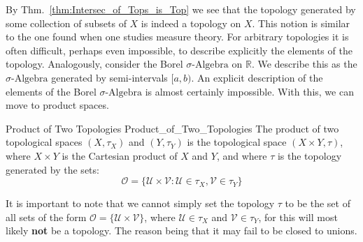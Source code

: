     By Thm.~\ref{thm:Intersec_of_Tops_is_Top} we see
    that the topology generated by some collection of subsets of
    $X$ is indeed a topology on $X$. This notion is similar to
    the one found when one studies measure theory. For
    arbitrary topologies it is often difficult, perhaps
    even impossible, to describe explicitly the elements of the
    topology. Analogously, consider the Borel
    $\sigma\textrm{-Algebra}$ on $\mathbb{R}$. We describe
    this as the $\sigma\textrm{-Algebra}$ generated by
    semi-intervals $[a,b)$. An explicit description of the elements
    of the Borel $\sigma\textrm{-Algebra}$ is almost certainly
    impossible. With this, we can move to product spaces.
    \begin{ldefinition}{Product of Two Topologies}
          {Product_of_Two_Topologies}
        The product of two topological spaces $(X,\tau_{X})$ and
        $(Y,\tau_{Y})$ is the topological space $(X\times{Y},\tau)$,
        where $X\times{Y}$ is the Cartesian product of $X$ and $Y$,
        and where $\tau$ is the topology generated by the sets:
        \begin{equation}
            \mathcal{O}=\big\{\mathcal{U}\times\mathcal{V}:
                \mathcal{U}\in\tau_{X},\mathcal{V}\in\tau_{Y}\big\}
        \end{equation}
    \end{ldefinition}
    It is important to note that we cannot simply set the topology
    $\tau$ to be the set of all sets of the form
    $\mathcal{O}=\big\{\mathcal{U}\times\mathcal{V}\big\}$, where
    $\mathcal{U}\in\tau_{X}$ and $\mathcal{V}\in\tau_{Y}$, for
    this will most likely \textbf{not} be a topology.
    The reason being that it may fail to be closed to unions.
